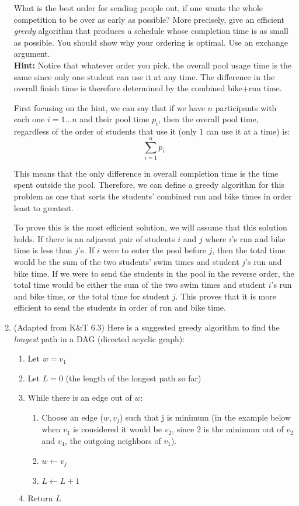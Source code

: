 \documentclass[letterpaper, 11pt]{article}
\begin{document}
\begin{enumerate}
    What is the best order for sending people out, if one wants the whole competition to be over as early as possible? More precisely, give an efficient \textit{greedy} algorithm that produces a schedule whose completion time is as small as possible. You should show why your ordering is optimal. Use an exchange argument. \\
    \textbf{Hint:} Notice that whatever order you pick, the overall pool usage time is the same since only one student can use it at any time. The difference in the overall finish time is therefore determined by the combined bike+run time.

    First focusing on the hint, we can say that if we have $n$ participants with each one $i = 1\ldots n$ and their pool time $p_i$, then the overall pool time, regardless of the order of students that use it (only 1 can use it at a time) is:
    \[\sum^n_{i=1}p_i\]

    This means that the only difference in overall completion time is the time spent outside the pool. Therefore, we can define a greedy algorithm for this problem as one that sorts the students' combined run and bike times in order least to greatest. 

    To prove this is the most efficient solution, we will assume that this solution holds. If there is an adjacent pair of students $i$ and $j$ where $i$'s run and bike time is less than $j$'s. If $i$ were to enter the pool before $j$, then the total time would be the sum of the two students' swim times and student $j$'s run and bike time. If we were to send the students in the pool in the reverse order, the total time would be either the sum of the two swim times and student $i$'s run and bike time, or the total time for student $j$. This proves that it is more efficient to send the students in order of run and bike time.

    \item (Adapted from K\&T 6.3) Here is a suggested greedy algorithm to find the \textit{longest} path in a DAG (directed acyclic graph):

    \begin{enumerate}[label={\arabic*}.]
        \item Let $w = v_1$
        \item Let $L = 0$ (the length of the longest path so far)
        \item While there is an edge out of $w$:
        \begin{enumerate}
            \item Choose an edge ($w, v_j$) such that j is minimum (in the example below when $v_1$ is considered it would be $v_2$, since 2 is the minimum out of $v_2$ and $v_4$, the outgoing neighbors of $v_1$).
            \item $w \leftarrow v_j$
            \item $L \leftarrow L + 1$
        \end{enumerate}
        \item Return $L$
    \end{enumerate}


\end{enumerate}
\end{document}
